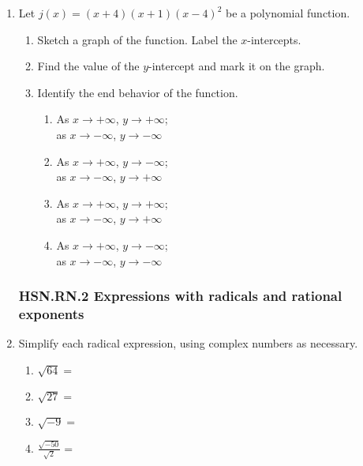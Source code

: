 \documentclass[12pt, twoside]{article}
\begin{document}
\begin{enumerate}[itemsep=0.5cm]
\item Let $j(x)= (x+4)(x+1)(x-4)^2$ be a polynomial function. 
    \begin{center}
    \end{center}
    \begin{enumerate}[itemsep=0.25cm]
        \item Sketch a graph of the function. Label the $x$-intercepts.
        \item Find the value of the $y$-intercept and mark it on the graph. \vspace{1cm}
        \item Identify the end behavior of the function.
            \begin{multicols}{2}
            \begin{enumerate}
                \item As $x \to +\infty$, $y \to +\infty$; \\ 
                as $x \to -\infty$, $y \to -\infty$
                \item As $x \to +\infty$, $y \to -\infty$; \\
                as $x \to -\infty$, $y \to +\infty$
                \item As $x \to +\infty$, $y \to +\infty$; \\
                as $x \to -\infty$, $y \to +\infty$
                \item As $x \to +\infty$, $y \to -\infty$; \\
                as $x \to -\infty$, $y \to -\infty$        
            \end{enumerate}
            \end{multicols}
    \end{enumerate}

\newpage

\subsubsection*{HSN.RN.2 Expressions with radicals and rational exponents}
\item Simplify each radical expression, using complex numbers as necessary.
    \begin{multicols}{2}
    \begin{enumerate}[itemsep=0.5cm]
        \item $\sqrt{64}=$
        \item $\sqrt{27}=$
        \item $\sqrt{-9}=$
        \item $\displaystyle \frac{\sqrt{-50}}{\sqrt{2}}=$
    \end{enumerate}
    \end{multicols} \vspace{1cm}
    

\end{enumerate}
\end{document}
